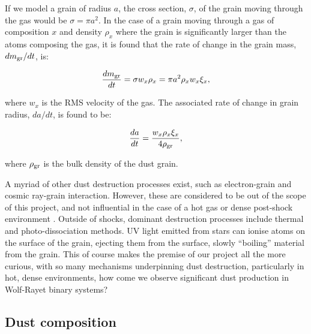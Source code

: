 If we model a grain of radius $a$, the cross section, $\sigma$, of the grain moving through the gas would be $\sigma = \pi a^2$.
In the case of a grain moving through a gas of composition $x$ and density $\rho_x$ where the grain is significantly larger than the atoms composing the gas, it is found that the rate of change in the grain mass, $dm_\text{gr}/dt$, is:

\begin{equation}
  \frac{dm_\text{gr}}{dt} = \sigma w_{x} \rho_{x} = \pi a^2 \rho_{x} w_{x} \xi_{x} ,
\end{equation}

\noindent
where $w_x$ is the RMS velocity of the gas.
The associated rate of change in grain radius, $da/dt$, is found to be:

\begin{equation}
  \frac{da}{dt} = \frac{w_x \rho_x \xi_x}{4 \rho_\text{gr}},
\end{equation}

\noindent
where $\rho_\text{gr}$ is the bulk density of the dust grain.

A myriad of other dust destruction processes exist, such as electron-grain and cosmic ray-grain interaction.
However, these are considered to be out of the scope of this project, and not influential in the case of a hot gas or dense post-shock environment
\parencite{jonesDustDestructionProcesses2004}.
Outside of shocks, dominant destruction processes include thermal and photo-dissociation methods.
UV light emitted from stars can ionise atoms on the surface of the grain, ejecting them from the surface, slowly ``boiling'' material from the grain.
This of course makes the premise of our project all the more curious, with so many mechanisms underpinning dust destruction, particularly in hot, dense environments, how come we observe significant dust production in Wolf-Rayet binary systems?

\subsection{Dust composition}

